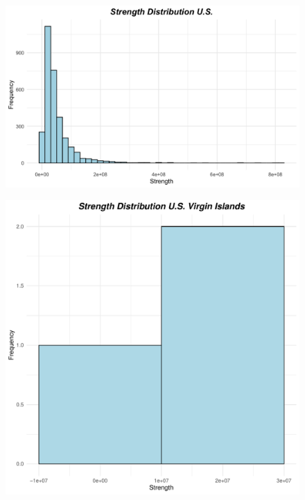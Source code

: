 \begin{figure}[h]
\begin{minipage}[t]{0.65\linewidth}
\centering
\includegraphics[width=\textwidth]{images/task1/U.S./strength_distibution_US.png} 
    \label{U.S.:strength}
\end{minipage}
\hfill
\begin{minipage}[t]{0.4\linewidth}
\includegraphics[width=\textwidth, page=17]{images/task1/strenght_plots.pdf} 
    \label{Virginia:strength}
\end{minipage}
\end{figure} 


